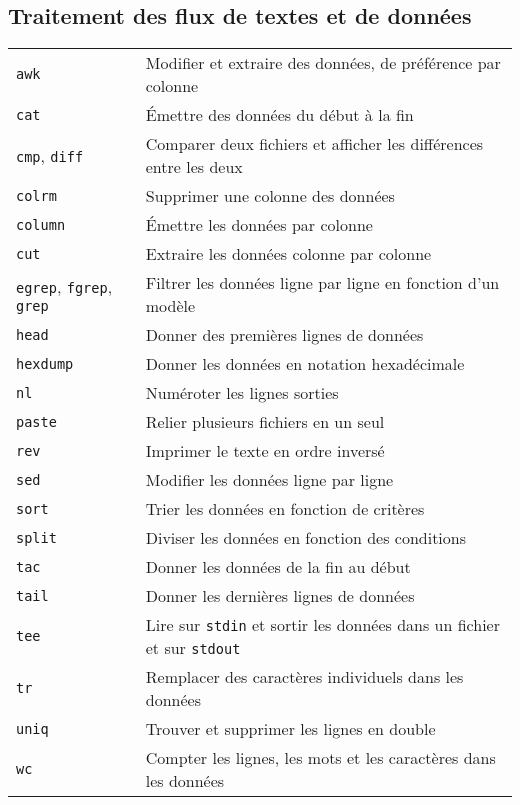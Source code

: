 \documentclass[10pt,a4paper]{article}
\begin{document}
\begin{multicols}{2}
\section{Traitement des flux de textes et de données}
\begin{tabular}{ p{2.5cm} p{8.5cm} }
  \hline
  \texttt{awk} & Modifier et extraire des données, de préférence par colonne \\
  \texttt{cat} & Émettre des données du début à la fin\\
  \texttt{cmp}, \texttt{diff} & Comparer deux fichiers et afficher les différences entre les deux\\
  \texttt{colrm} & Supprimer une colonne des données \\
  \texttt{column} & Émettre les données par colonne \\
  \texttt{cut} &  Extraire les données colonne par colonne\\
  \texttt{egrep}, \texttt{fgrep}, \texttt{grep} & Filtrer les données ligne par ligne en fonction d'un modèle\\
  \texttt{head} & Donner des premières lignes de données\\
  \texttt{hexdump} & Donner les données en notation hexadécimale\\
  \texttt{nl} & Numéroter les lignes sorties \\
  \texttt{paste} & Relier plusieurs fichiers en un seul \\
  \texttt{rev} & Imprimer le texte en ordre inversé \\
  \texttt{sed} & Modifier les données ligne par ligne \\
  \texttt{sort} & Trier les données en fonction de critères\\
  \texttt{split} & Diviser les données en fonction des conditions \\
  \texttt{tac} & Donner les données de la fin au début\\
  \texttt{tail} & Donner les dernières lignes de données\\
  \texttt{tee} & Lire sur \texttt{stdin} et sortir les données dans un fichier et sur \texttt{stdout}\\
  \texttt{tr} & Remplacer des caractères individuels dans les données\\
  \texttt{uniq} & Trouver et supprimer les lignes en double \\
  \texttt{wc} & Compter les lignes, les mots et les caractères dans les données\\
  \hline
\end{tabular}

\end{multicols}
\end{document}
